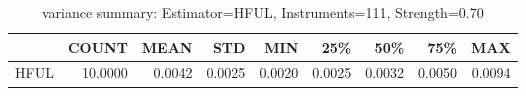 \begin{table}[ht]
\centering
\caption{variance summary: Estimator=HFUL, Instruments=111, Strength=0.70}
\begin{tabular}{lrrrrrrrr}
\toprule
 & COUNT & MEAN & STD & MIN & 25\% & 50\% & 75\% & MAX \\
\midrule
HFUL & 10.0000 & 0.0042 & 0.0025 & 0.0020 & 0.0025 & 0.0032 & 0.0050 & 0.0094 \\
\bottomrule
\end{tabular}
\end{table}
